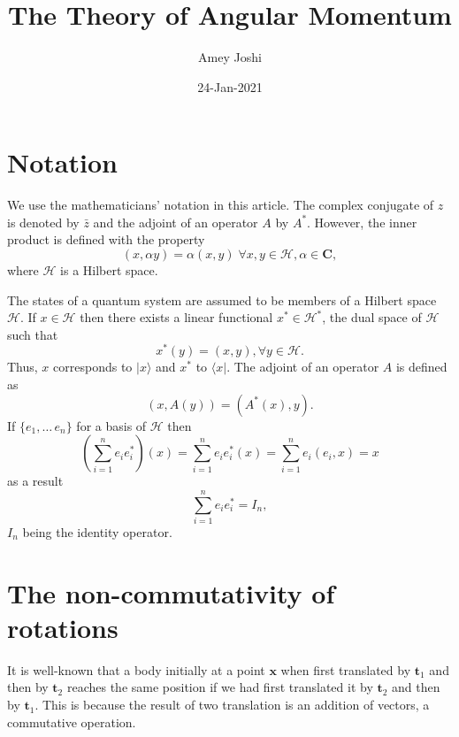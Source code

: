 \documentclass{article}
\title{The Theory of Angular Momentum}
\author{Amey Joshi}
\date{24-Jan-2021}
\numberwithin{equation}{section}
\let\vec\bm
\theoremstyle{plain}
\numberwithin{thm}{section}
\theoremstyle{plain}
\numberwithin{prop}{section}
\theoremstyle{definition}
\numberwithin{defn}{section}
\theoremstyle{remark}
\begin{document}
\maketitle
{}
\section{Notation}\label{s1}
We use the mathematicians' notation in this article. The complex conjugate of
$z$ is denoted by $\bar{z}$ and the adjoint of an operator $A$ by $A^\ast$.
However, the inner product is defined with the property
\begin{equation}\label{s1e1}
(x,\alpha y)=\alpha(x, y)\;\forall x, y \in \mathcal{H}, \alpha \in \mathbf{C},
\end{equation}
where $\mathcal{H}$ is a Hilbert space.

The states of a quantum system are assumed to be members of a Hilbert space
$\mathcal{H}$. If $x \in \mathcal{H}$ then there exists a linear functional
$x^\ast \in \mathcal{H}^\ast$, the dual space of $\mathcal{H}$ such that
\begin{equation}\label{s1e2}
x^\ast(y) = (x, y), \forall y \in \mathcal{H}.
\end{equation}
Thus, $x$ corresponds to $|x\rangle$ and $x^\ast$ to $\langle x|$. The adjoint
of an operator $A$ is defined as
\begin{equation}\label{s1e3}
(x, A(y)) = (A^\ast(x), y).
\end{equation}
If $\{e_1, \ldots\, e_n\}$ for a basis of $\mathcal{H}$ then
\begin{equation}\label{s1e4}
\left(\sum_{i=1}^n e_i e_i^\ast\right)(x) = \sum_{i=1}^n e_i e_i^\ast(x) = 
\sum_{i=1}^n e_i (e_i, x) = x
\end{equation}
as a result
\begin{equation}\label{s1e5}
\sum_{i=1}^n e_i e_i^\ast = I_n,
\end{equation}
$I_n$ being the identity operator.

\section{The non-commutativity of rotations}\label{s2}
It is well-known that a body initially at a point $\vec{x}$ when first 
translated by $\vec{t}_1$ and then by $\vec{t}_2$ reaches the same position if 
we had first translated it by $\vec{t}_2$ and then by $\vec{t}_1$. This is 
because the result of two translation is an addition of vectors, a commutative 
operation.
\end{document}
